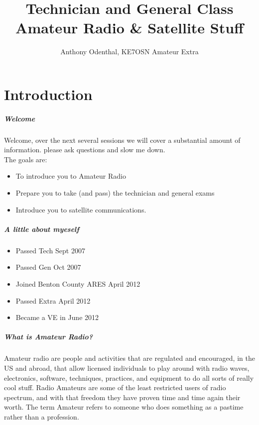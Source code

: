\documentclass[10pt]{beamer}
\author{Anthony Odenthal, KE7OSN Amateur Extra}
\title{Technician and General Class Amateur Radio \& Satellite Stuff}
\begin{document}
\frame{\titlepage}


\part{Introduction}

\begin{frame}
\frametitle{Welcome}
Welcome, over the next several sessions we will cover a substantial amount of information. please ask questions and slow me down.\\
The goals are:
\begin{itemize}
\item To introduce you to Amateur Radio \pause
\item Prepare you to take (and pass) the technician and general exams \pause
\item Introduce you to satellite communications.
\end{itemize}
\end{frame}

\begin{frame}
\frametitle{A little about myeself}
\begin{itemize}
\item Passed Tech Sept 2007
\item Passed Gen Oct 2007
\item Joined Benton County ARES April 2012
\item Passed Extra April 2012
\item Became a VE in June 2012
\end{itemize}
\end{frame}

\begin{frame}
\frametitle{What is Amateur Radio?}
Amateur radio are people and activities that are regulated and encouraged, in the US and abroad, that allow licensed individuals to play around with radio waves, electronics, software, techniques, practices, and equipment to do all sorts of really cool stuff. Radio Amateurs are some of the least restricted users of radio spectrum, and with that freedom they have proven time and time again their worth.
The term Amateur refers to someone who does something as a pastime rather than a profession.
\end{frame}
\end{document}
